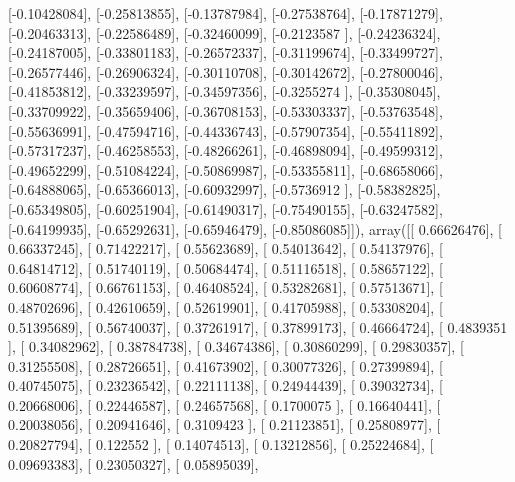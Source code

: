 \documentclass{article}
\begin{document}
       [-0.10428084],
       [-0.25813855],
       [-0.13787984],
       [-0.27538764],
       [-0.17871279],
       [-0.20463313],
       [-0.22586489],
       [-0.32460099],
       [-0.2123587 ],
       [-0.24236324],
       [-0.24187005],
       [-0.33801183],
       [-0.26572337],
       [-0.31199674],
       [-0.33499727],
       [-0.26577446],
       [-0.26906324],
       [-0.30110708],
       [-0.30142672],
       [-0.27800046],
       [-0.41853812],
       [-0.33239597],
       [-0.34597356],
       [-0.3255274 ],
       [-0.35308045],
       [-0.33709922],
       [-0.35659406],
       [-0.36708153],
       [-0.53303337],
       [-0.53763548],
       [-0.55636991],
       [-0.47594716],
       [-0.44336743],
       [-0.57907354],
       [-0.55411892],
       [-0.57317237],
       [-0.46258553],
       [-0.48266261],
       [-0.46898094],
       [-0.49599312],
       [-0.49652299],
       [-0.51084224],
       [-0.50869987],
       [-0.53355811],
       [-0.68658066],
       [-0.64888065],
       [-0.65366013],
       [-0.60932997],
       [-0.5736912 ],
       [-0.58382825],
       [-0.65349805],
       [-0.60251904],
       [-0.61490317],
       [-0.75490155],
       [-0.63247582],
       [-0.64199935],
       [-0.65292631],
       [-0.65946479],
       [-0.85086085]]), array([[ 0.66626476],
       [ 0.66337245],
       [ 0.71422217],
       [ 0.55623689],
       [ 0.54013642],
       [ 0.54137976],
       [ 0.64814712],
       [ 0.51740119],
       [ 0.50684474],
       [ 0.51116518],
       [ 0.58657122],
       [ 0.60608774],
       [ 0.66761153],
       [ 0.46408524],
       [ 0.53282681],
       [ 0.57513671],
       [ 0.48702696],
       [ 0.42610659],
       [ 0.52619901],
       [ 0.41705988],
       [ 0.53308204],
       [ 0.51395689],
       [ 0.56740037],
       [ 0.37261917],
       [ 0.37899173],
       [ 0.46664724],
       [ 0.4839351 ],
       [ 0.34082962],
       [ 0.38784738],
       [ 0.34674386],
       [ 0.30860299],
       [ 0.29830357],
       [ 0.31255508],
       [ 0.28726651],
       [ 0.41673902],
       [ 0.30077326],
       [ 0.27399894],
       [ 0.40745075],
       [ 0.23236542],
       [ 0.22111138],
       [ 0.24944439],
       [ 0.39032734],
       [ 0.20668006],
       [ 0.22446587],
       [ 0.24657568],
       [ 0.1700075 ],
       [ 0.16640441],
       [ 0.20038056],
       [ 0.20941646],
       [ 0.3109423 ],
       [ 0.21123851],
       [ 0.25808977],
       [ 0.20827794],
       [ 0.122552  ],
       [ 0.14074513],
       [ 0.13212856],
       [ 0.25224684],
       [ 0.09693383],
       [ 0.23050327],
       [ 0.05895039],
\end{document}
